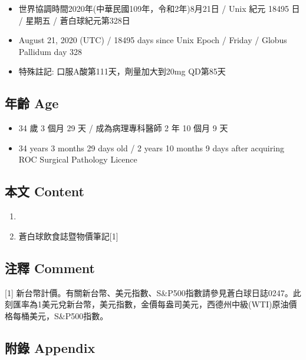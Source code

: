 \documentclass[a5paper, 11pt
]{book}
\providecommand{\tightlist}{%
  \setlength{\itemsep}{0pt}\setlength{\parskip}{0pt}}
\begin{document}
\begin{itemize}
\tightlist
\item
  世界協調時間2020年(中華民國109年，令和2年)8月21日 / Unix 紀元 18495 日
  / 星期五 / 蒼白球紀元第328日
\item
  August 21, 2020 (UTC) / 18495 days since Unix Epoch / Friday / Globus
  Pallidum day 328
\item
  特殊註記: 口服A酸第111天，劑量加大到20mg QD第85天
\end{itemize}

\hypertarget{ux5e74ux9f61-age-81}{%
\subsection{年齡 Age}\label{ux5e74ux9f61-age-81}}

\begin{itemize}
\tightlist
\item
  34 歲 3 個月 29 天 / 成為病理專科醫師 2 年 10 個月 9 天
\item
  34 years 3 months 29 days old / 2 years 10 months 9 days after
  acquiring ROC Surgical Pathology Licence
\end{itemize}

\hypertarget{ux672cux6587-content-81}{%
\subsection{本文 Content}\label{ux672cux6587-content-81}}

\begin{enumerate}
\def\labelenumi{\arabic{enumi}.}
\tightlist
\item
\item
  蒼白球飲食誌暨物價筆記{[}1{]}
\end{enumerate}

\hypertarget{ux6ce8ux91cb-comment-81}{%
\subsection{注釋 Comment}\label{ux6ce8ux91cb-comment-81}}

{[}1{]}
新台幣計價。有關新台幣、美元指數、S\&P500指數請參見蒼白球日誌0247。此刻匯率為1美元兌新台幣，美元指數，金價每盎司美元，西德州中級(WTI)原油價格每桶美元，S\&P500指數。

\hypertarget{ux9644ux9304-appendix-81}{%
\subsection{附錄 Appendix}\label{ux9644ux9304-appendix-81}}
\end{document}
